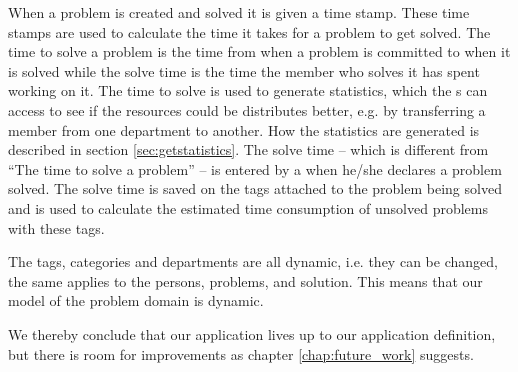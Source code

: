 When a problem is created and solved it is given a time stamp.
These time stamps are used to calculate the time it takes for a problem to get solved.
The time to solve a problem is the time from when a problem is committed to when it is solved while the solve time is the time the \astaff[] member who solves it has spent working on it.
The time to solve is used to generate statistics, which the \admin[]s can access to see if the resources could be distributes better, e.g. by transferring a \astaff[] member from one department to another.
How the statistics are generated is described in section \ref{sec:getstatistics}.
The solve time -- which is different from ``The time to solve a problem'' -- is entered by a \astaff[] when he/she declares a problem solved.
The solve time is saved on the tags attached to the problem being solved and is used to calculate the estimated time consumption of unsolved problems with these tags.

The tags, categories and departments are all dynamic, i.e. they can be changed, the same applies to the persons, problems, and solution.
This means that our model of the problem domain is dynamic.

We thereby conclude that our application lives up to our application definition, but there is room for improvements as chapter \ref{chap:future_work} suggests.











